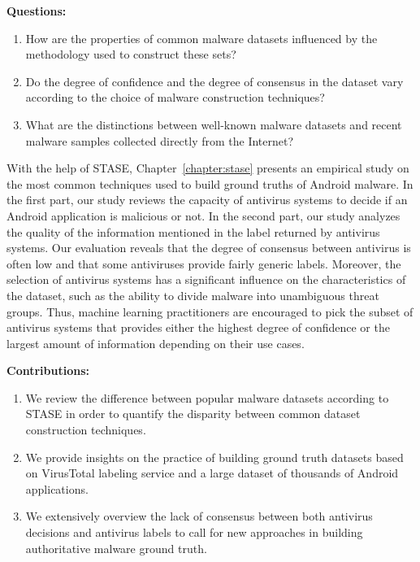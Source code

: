 \begin{mdframed}[hidealllines=true,nobreak=true]
\textbf{Questions:}

\begin{enumerate}
	\item How are the properties of common malware datasets influenced by the methodology used to construct these sets?
	\item Do the degree of confidence and the degree of consensus in the dataset vary according to the choice of malware construction techniques?
	\item What are the distinctions between well-known malware datasets and recent malware samples collected directly from the Internet?
\end{enumerate}
\end{mdframed}

With the help of STASE, Chapter~\ref{chapter:stase} presents an empirical study on the most common techniques used to build ground truths of Android malware.
In the first part, our study reviews the capacity of antivirus systems to decide if an Android application is malicious or not.
In the second part, our study analyzes the quality of the information mentioned in the label returned by antivirus systems.
Our evaluation reveals that the degree of consensus between antivirus is often low and that some antiviruses provide fairly generic labels.
Moreover, the selection of antivirus systems has a significant influence on the characteristics of the dataset, such as the ability to divide malware into unambiguous threat groups.
Thus, machine learning practitioners are encouraged to pick the subset of antivirus systems that provides either the highest degree of confidence or the largest amount of information depending on their use cases.

\begin{mdframed}[hidealllines=true,nobreak=true]
\textbf{Contributions:}

\begin{enumerate}
	\item We review the difference between popular malware datasets according to STASE in order to quantify the disparity between common dataset construction techniques.
	\item We provide insights on the practice of building ground truth datasets based on VirusTotal labeling service and a large dataset of thousands of Android applications.
	\item We extensively overview the lack of consensus between both antivirus decisions and antivirus labels to call for new approaches in building authoritative malware ground truth.
\end{enumerate}
\end{mdframed}


